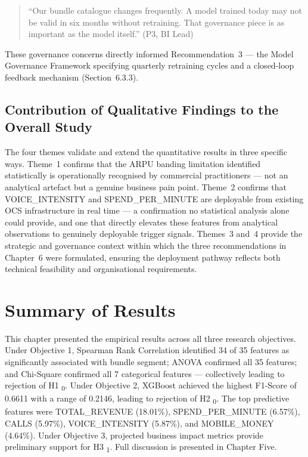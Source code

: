 \begin{quote}
``Our bundle catalogue changes frequently. A model trained today may not be valid
in six months without retraining. That governance piece is as important as the
model itself.'' (P3, BI Lead)
\end{quote}

These governance concerns directly informed Recommendation~3 --- the Model
Governance Framework specifying quarterly retraining cycles and a closed-loop
feedback mechanism (Section~6.3.3).

\subsection{Contribution of Qualitative Findings to the Overall Study}

The four themes validate and extend the quantitative results in three specific
ways. Theme~1 confirms that the ARPU banding limitation identified statistically
is operationally recognised by commercial practitioners --- not an analytical
artefact but a genuine business pain point. Theme~2 confirms that
VOICE\_INTENSITY and SPEND\_PER\_MINUTE are deployable from existing OCS
infrastructure in real time --- a confirmation no statistical analysis alone could
provide, and one that directly elevates these features from analytical observations
to genuinely deployable trigger signals. Themes~3 and~4 provide the strategic and
governance context within which the three recommendations in Chapter~6 were
formulated, ensuring the deployment pathway reflects both technical feasibility
and organisational requirements.

\section{Summary of Results}

This chapter presented the empirical results across all three research objectives. Under Objective 1, Spearman Rank Correlation identified 34 of 35 features as significantly associated with bundle segment; ANOVA confirmed all 35 features; and Chi-Square confirmed all 7 categorical features --- collectively leading to rejection of H1 \textsubscript{0}. Under Objective 2, XGBoost achieved the highest F1-Score of 0.6611 with a range of 0.2146, leading to rejection of H2	\textsubscript{0}. The top predictive features were TOTAL\_REVENUE (18.01\%), SPEND\_PER\_MINUTE (6.57\%), CALLS (5.97\%), VOICE\_INTENSITY (5.87\%), and MOBILE\_MONEY (4.64\%). Under Objective 3, projected business impact metrics provide preliminary support for H3	\textsubscript{1}. Full discussion is presented in Chapter Five.



